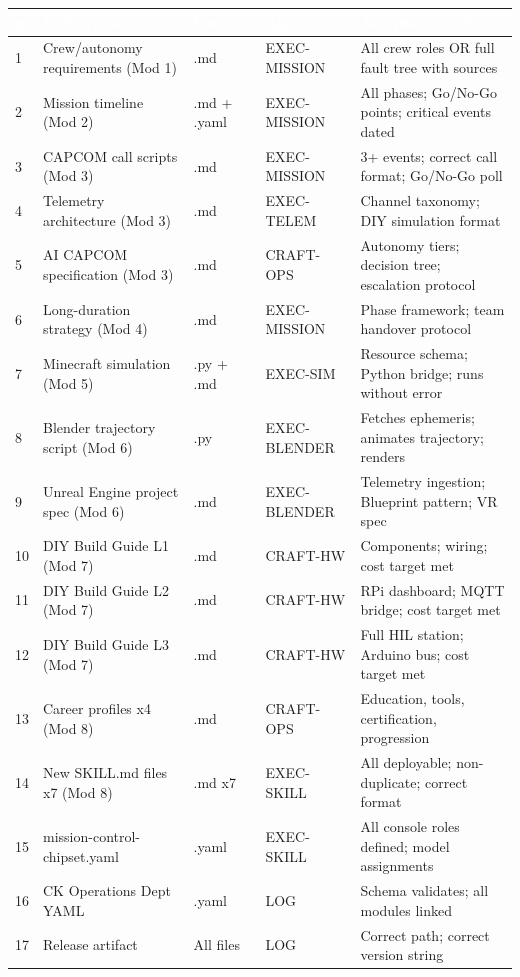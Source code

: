 \documentclass[11pt,letterpaper]{article}
\newcommand{\tableheader}[1]{\textbf{\sffamily\textcolor{white}{#1}}}
\begin{document}
\begin{center}
\begin{tabularx}{\textwidth}{C{0.4cm}L{4.5cm}C{1.5cm}L{2cm}X}
\toprule
{}
\tableheader{\#} & \tableheader{Deliverable} & \tableheader{Format} & \tableheader{Agent} & \tableheader{Acceptance Criteria} \\
 & Crew/autonomy requirements (Mod 1) & .md & EXEC-MISSION & All crew roles OR full fault tree with sources \\
2 & Mission timeline (Mod 2) & .md + .yaml & EXEC-MISSION & All phases; Go/No-Go points; critical events dated \\
3 & CAPCOM call scripts (Mod 3) & .md & EXEC-MISSION & 3+ events; correct call format; Go/No-Go poll \\
4 & Telemetry architecture (Mod 3) & .md & EXEC-TELEM & Channel taxonomy; DIY simulation format \\
5 & AI CAPCOM specification (Mod 3) & .md & CRAFT-OPS & Autonomy tiers; decision tree; escalation protocol \\
6 & Long-duration strategy (Mod 4) & .md & EXEC-MISSION & Phase framework; team handover protocol \\
7 & Minecraft simulation (Mod 5) & .py + .md & EXEC-SIM & Resource schema; Python bridge; runs without error \\
8 & Blender trajectory script (Mod 6) & .py & EXEC-BLENDER & Fetches ephemeris; animates trajectory; renders \\
9 & Unreal Engine project spec (Mod 6) & .md & EXEC-BLENDER & Telemetry ingestion; Blueprint pattern; VR spec \\
10 & DIY Build Guide L1 (Mod 7) & .md & CRAFT-HW & Components; wiring; cost target met \\
11 & DIY Build Guide L2 (Mod 7) & .md & CRAFT-HW & RPi dashboard; MQTT bridge; cost target met \\
12 & DIY Build Guide L3 (Mod 7) & .md & CRAFT-HW & Full HIL station; Arduino bus; cost target met \\
13 & Career profiles x4 (Mod 8) & .md & CRAFT-OPS & Education, tools, certification, progression \\
14 & New SKILL.md files x7 (Mod 8) & .md x7 & EXEC-SKILL & All deployable; non-duplicate; correct format \\
15 & mission-control-chipset.yaml & .yaml & EXEC-SKILL & All console roles defined; model assignments \\
16 & CK Operations Dept YAML & .yaml & LOG & Schema validates; all modules linked \\
17 & Release artifact & All files & LOG & Correct path; correct version string \\
\bottomrule
\end{tabularx}
\end{center}
\end{document}
